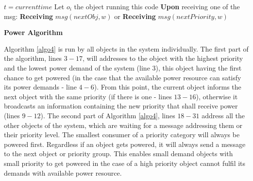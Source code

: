 \documentclass[../main/IoT.tex]{subfiles}
\begin{document}
\LinesNumbered
\IncMargin{1em}
\begin{algorithm}
$t = current time$
\BlankLine
Let $o_{i}$ the object running this code
\BlankLine
{}
\textbf{Upon} receiving one of the msg:\newline
\textbf{Receiving} $msg(nextObj, w)$ or\newline
\textbf{Receiving} $msg(nextPriority, w)$\newline
{}
\caption{\textbf{Power Algorithm}} \label{algo4}
\end{algorithm}
\DecMargin{1em}

Algorithm \ref{algo4} is run by all objects in the system individually. The first part of the algorithm, lines $3-17$, will addresses to the object with the highest priority and the lowest power demand of the system (line $3$), this object having the first chance to get powered (in the case that the available power resource can satisfy its power demands - line $4-6$). From this point, the current object informs the next object with the same priority (if there is one - lines $13-16$), otherwise it broadcasts an information containing the new priority that shall receive power (lines $9-12$). The second part of Algorithm \ref{algo4}, lines $18-31$ address all the other objects of the system, which are waiting for a message addressing them or their priority level. The smallest consumer of a priority category will always be powered first. Regardless if an object gets powered, it will always send a message to the next object or priority group. This enables small demand objects with small priority to get powered in the case of a high priority object cannot fulfil its demands with available power resource.
\end{document}

